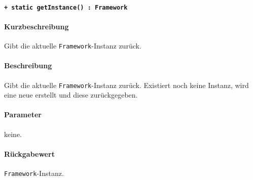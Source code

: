 \paragraph{\texttt{+ static getInstance() : Framework}}\label{AP_Framework_getInstance}%
\paragraph*{Kurzbeschreibung}
Gibt die aktuelle \verb#Framework#-Instanz zurück.
\paragraph*{Beschreibung}
Gibt die aktuelle \verb#Framework#-Instanz zurück.
Existiert noch keine Instanz, wird eine neue erstellt und diese zurückgegeben.
\paragraph*{Parameter}
keine.
\paragraph*{Rückgabewert}
\verb#Framework#-Instanz.